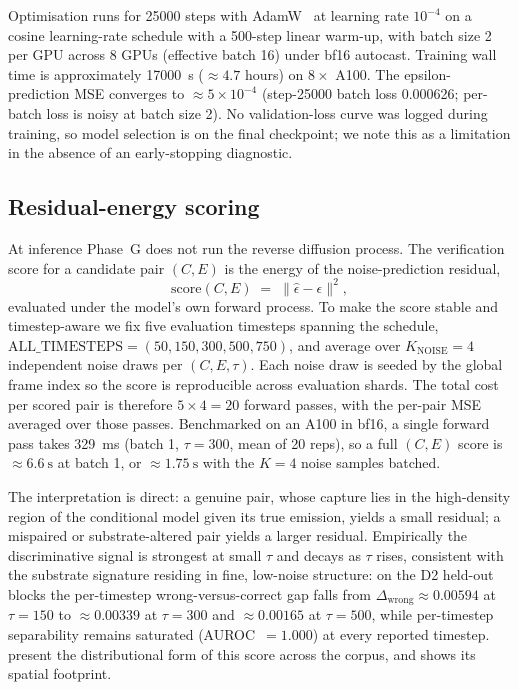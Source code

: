 Optimisation runs for \num{25000} steps with AdamW~\cite{loshchilov2019adamw} at learning rate $10^{-4}$ on a cosine learning-rate schedule with a \num{500}-step linear warm-up, with batch size 2 per GPU across 8 GPUs (effective batch 16) under bf16 autocast. Training wall time is approximately \SI{17000}{\second} ($\approx 4.7$ hours) on $8\times$ A100. The epsilon-prediction MSE converges to $\approx 5\times10^{-4}$ (step-\num{25000} batch loss \num{0.000626}; per-batch loss is noisy at batch size 2). No validation-loss curve was logged during training, so model selection is on the final checkpoint; we note this as a limitation in the absence of an early-stopping diagnostic.

\subsection{Residual-energy scoring}

At inference Phase~G does not run the reverse diffusion process. The verification score for a candidate pair $(C,E)$ is the energy of the noise-prediction residual,
\[
\text{score}(C,E) \;=\; \big\lVert \hat{\epsilon} - \epsilon \big\rVert^2 ,
\]
evaluated under the model's own forward process. To make the score stable and timestep-aware we fix five evaluation timesteps spanning the schedule, $\mathrm{ALL\_TIMESTEPS}=(50,150,300,500,750)$, and average over $K_{\mathrm{NOISE}}=4$ independent noise draws per $(C,E,\tau)$. Each noise draw is seeded by the global frame index so the score is reproducible across evaluation shards. The total cost per scored pair is therefore $5\times4 = 20$ forward passes, with the per-pair MSE averaged over those passes. Benchmarked on an A100 in bf16, a single forward pass takes \SI{329}{\milli\second} (batch 1, $\tau=300$, mean of 20 reps), so a full $(C,E)$ score is $\approx\SI{6.6}{\second}$ at batch 1, or $\approx\SI{1.75}{\second}$ with the $K=4$ noise samples batched.

The interpretation is direct: a genuine pair, whose capture lies in the high-density region of the conditional model given its true emission, yields a small residual; a mispaired or substrate-altered pair yields a larger residual. Empirically the discriminative signal is strongest at small $\tau$ and decays as $\tau$ rises, consistent with the substrate signature residing in fine, low-noise structure: on the D2 held-out blocks the per-timestep wrong-versus-correct gap falls from $\Delta_{\text{wrong}}\approx\num{0.00594}$ at $\tau=150$ to $\approx\num{0.00339}$ at $\tau=300$ and $\approx\num{0.00165}$ at $\tau=500$, while per-timestep separability remains saturated (AUROC~$=1.000$) at every reported timestep.  present the distributional form of this score across the corpus, and  shows its spatial footprint.

